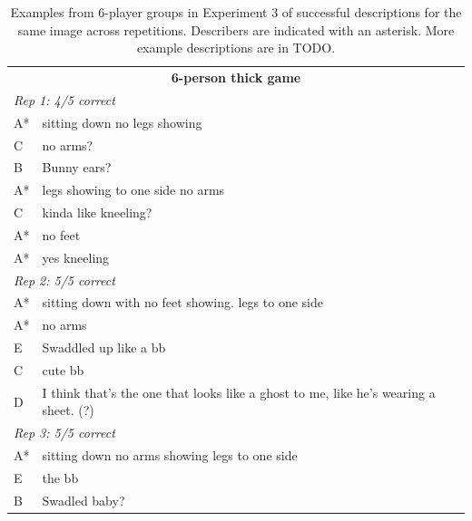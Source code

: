 \documentclass[
  english,
]{article}
\begin{document}
\begin{table}
    \centering

    \caption{Examples from 6-player groups in Experiment 3 of successful descriptions for the same image across repetitions. Describers are indicated with an asterisk. More example descriptions are in TODO. \\\label{listener-examples}}
    \begin{subtable}{0.5\linewidth}
        \centering
            \begin{tabular}{lp{2.5in}}
            \hline
            
            \multicolumn{2}{c}{\textbf{6-person thick game}}\\
            \multicolumn{2}{l}{\textit{Rep 1: 4/5 correct}}\\
            A*  &   sitting down no legs showing   \\                
            C   & no arms?\\                       
            B  &    Bunny ears?  \\                                  
            A*  &   legs showing to one side no arms  \\             
            C  &    kinda like kneeling?  \\                         
            A*  &   no feet      \\                                  
            A*   &  yes kneeling  \\
            \multicolumn{2}{l}{\textit{Rep 2: 5/5 correct}}\\
            A*  &   sitting down with no feet showing. legs to one side \\
            A*  &  no arms   \\                                     
            E &      Swaddled up like a bb \\                         
            C  &    cute bb    \\                                    
            D  &    I think that's the one that looks like a ghost to me, like he's wearing a sheet. (?)\\
            \multicolumn{2}{l}{\textit{Rep 3: 5/5 correct}}\\
            A*  &    sitting down no arms showing legs to one side  \\
            E  &   the bb   \\                                      
            B  &  Swadled baby?  \\                                

\end{tabular}
\end{subtable}
\end{table}
\end{document}
